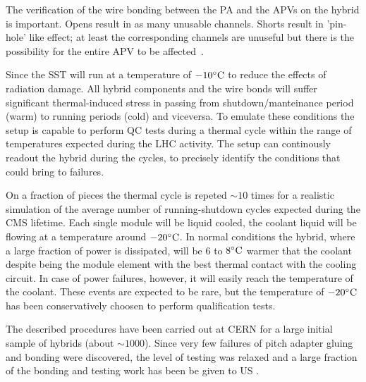The verification of the wire bonding between the PA and the APVs on
the hybrid is important. Opens result in as many unusable 
channels. Shorts result in 'pin-hole' like effect; at
least the corresponding channels are unuseful but there is the
possibility for the entire APV to be affected~\cite{hip}. 

Since the SST will run at a temperature of $-10^{\circ}{\rm C}$ to reduce the
effects of radiation damage. All hybrid components and the wire bonds
will suffer significant thermal-induced stress in passing from
shutdown/manteinance period (warm) to running periods (cold) and viceversa.
To emulate these conditions the setup is capable to perform QC tests
during a thermal cycle within the range of temperatures expected
during the LHC activity. The setup
can continously readout the hybrid during the cycles, to precisely
identify the conditions that could bring to failures.

On a fraction of pieces the thermal cycle is repeted $\sim10$ times
for a realistic simulation of the average number of running-shutdown cycles
expected during the CMS lifetime. Each single module will be liquid cooled,
the coolant liquid will be flowing at a temperature around
$-20^{\circ}{\rm C}$. In normal conditions the hybrid, where a large fraction 
of power is dissipated, will be $6$ to $8^{\circ}{\rm C}$ warmer that the
coolant despite being the module element with the best thermal contact
with the cooling circuit. In case of power failures, however, it will
easily reach the temperature of the coolant. These events are
expected to be rare, but the temperature of $-20^{\circ}{\rm C}$ has been
conservatively choosen to perform qualification tests.


The described procedures have been carried out at CERN for a large
initial sample of hybrids (about $\sim1000$). Since very few 
failures of pitch adapter gluing and bonding were discovered, the
level of testing was relaxed and a large fraction of the bonding and
testing work has been be given to US \fixme.

